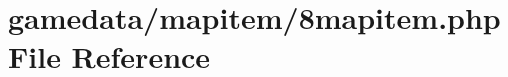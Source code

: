 \hypertarget{8mapitem_8php}{\section{gamedata/mapitem/8mapitem.php File Reference}
\label{8mapitem_8php}
}
